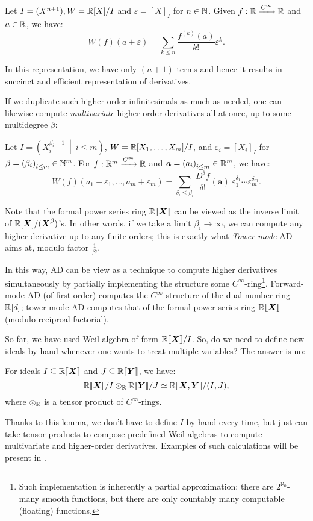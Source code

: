 \documentclass[%
  sigconf,authorversion,screen]{acmart}
\begin{document}
\begin{lemma}\label{lem:higher-infinitesimal}
  Let $I = (X^{n + 1}), W = \mathbb{R}[X]/I$ and $\varepsilon = {[X]}_I$ for $n \in \mathbb{N}$.
  Given $f: \mathbb{R} \xrightarrow{C^\infty} \mathbb{R}$ and $a \in \mathbb{R}$, we have:
  \[
    W(f)(a + \varepsilon)
    = \sum_{k \leq n} \frac{f^{(k)}(a)}{k !} \varepsilon^k.
  \]
\end{lemma}
In this representation, we have only $(n + 1)$-terms and hence it results in succinct and efficient representation of derivatives.

If we duplicate such higher-order infinitesimals as much as needed, one can likewise compute \emph{multivariate} higher-order derivatives all at once, up to some multidegree $\beta$:
\begin{lemma}
  Let $I = \left(X_i^{\beta_i + 1}\ \middle|\ i \leq m \right)$, $W = \mathbb{R}[X_1, \dots, X_m]/I$, and $\varepsilon_i = {[X_i]}_I$ for $\beta = {(\beta_i)}_{i \leq m} \in \mathbb{N}^m$.
  For $f: \mathbb{R}^m \xrightarrow{C^\infty} \mathbb{R}$ and $\boldsymbol{a} = {(a_i)}_{i \leq m} \in \mathbb{R}^m$, we have:
  \[
    W(f)(a_1 + \varepsilon_1, \dots, a_m + \varepsilon_m) =
      \sum_{\delta_i \leq \beta_i} 
      \frac{D^\delta f}{\delta !}(\boldsymbol{a})\ \varepsilon_1^{\delta_1} \cdots \varepsilon_m^{\delta_m}.
  \]
\end{lemma}

Note that the formal power series ring $\mathord{\mathbb{R}\llbracket\boldsymbol{X}\rrbracket}$ can be viewed as the inverse limit of $\mathbb{R}[\boldsymbol{X}]/(\boldsymbol{X}^\beta)$'s.
In other words, if we take a limit $\beta_i \to \infty$, we can compute any higher derivative up to any finite orders; this is exactly what \emph{Tower-mode} AD aims at, modulo factor $\frac{1}{\beta!}$.

In this way, AD can be view as a technique to compute higher derivatives simultaneously by partially implementing the structure some $C^\infty$-ring\footnote{Such implementation is inherently a partial approximation: there are $2^{\aleph_0}$-many smooth functions, but there are only countably many computable (floating) functions.}.
Forward-mode AD (of first-order) computes the $C^\infty$-structure of the dual number ring $\mathbb{R}[d]$; tower-mode AD computes that of the formal power series ring $\mathord{\mathbb{R}\llbracket\boldsymbol{X}\rrbracket}$ (modulo reciproal factorial).

So far, we have used Weil algebra of form $\mathord{\mathbb{R}\llbracket\boldsymbol{X}\rrbracket}/I$.
So, do we need to define new ideals by hand whenever one wants to treat multiple variables?
The answer is no:

\begin{lemma}
  \label{thm:quot-tensor}
  For ideals $I \subseteq \mathbb{R}\llbracket\boldsymbol{X}\rrbracket$ and $J \subseteq \mathbb{R}\llbracket{}\boldsymbol{Y}\rrbracket$, we have:
  \[
    \mathord{\mathbb{R}\llbracket\boldsymbol{X}\rrbracket}/I \otimes_{\mathbb{R}} \mathbb{R}\llbracket{}\boldsymbol{Y}\rrbracket/J \simeq
    \mathbb{R}\llbracket{}\boldsymbol{X}, \boldsymbol{Y}\rrbracket/(I, J),
  \]
  where $\otimes_{\mathbb{R}}$ is a tensor product of $C^\infty$-rings.
\end{lemma}
Thanks to this lemma, we don't have to define $I$ by hand every time, but just can take tensor products to compose predefined Weil algebras to compute multivariate and higher-order derivatives.
Examples of such calculations will be present in .
\end{document}
